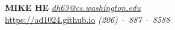\documentclass{cv}
\begin{document}
\vspace{-0.5in}

\MakeUppercase{\Large{\textbf{Mike He}}} \hfill {\em{\href{mailto:dh63@cs.washington.edu}{dh63@cs.washington.edu}}}\\
\vspace{-5pt}\href{https://ad1024.github.io}{https://ad1024.github.io} \hfill{\em (206)~$\cdot$~887~$\cdot$~8588}



\end{document}
